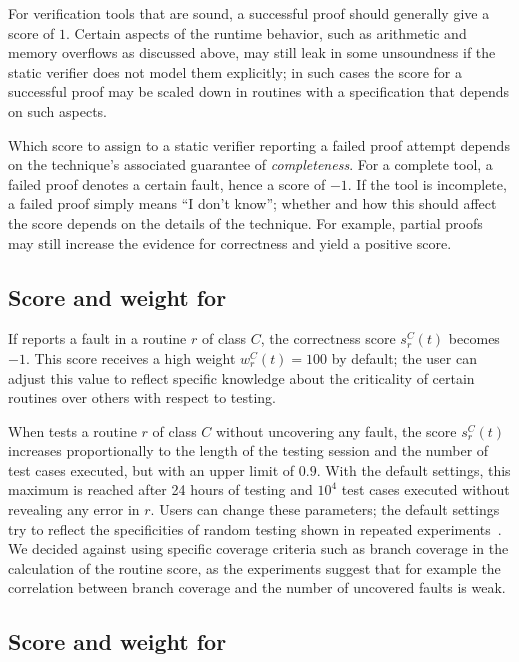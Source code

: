For verification tools that are sound, a successful proof should generally give a score of $1$.
Certain aspects of the runtime behavior, such as arithmetic and memory overflows as discussed above, may still leak in some unsoundness if the static verifier does not model them explicitly; in such cases the score for a successful proof may be scaled down in routines with a specification that depends on such aspects.

Which score to assign to a static verifier reporting a failed proof attempt depends on the technique's associated guarantee of \emph{completeness}.
For a complete tool, a failed proof denotes a certain fault, hence a score of $-1$.
If the tool is incomplete, a failed proof simply means ``I don't know''; whether and how this should affect the score depends on the details of the technique.
For example, partial proofs may still increase the evidence for correctness and yield a positive score.


\subsection{Score and weight for \AutoTest}

If \AutoTest reports a fault in a routine $r$ of class $C$, the correctness score $s_r^C(t)$ becomes $-1$.  This score receives a high weight $w_r^C(t) = 100$ by default; the user can adjust this value to reflect specific knowledge about the criticality of certain routines over others with respect to testing.

When \AutoTest tests a routine $r$ of class $C$ without uncovering any fault, the score $s_r^C(t)$ increases proportionally to the length of
the testing session and the number of test cases executed, but with an upper limit of $0.9$.
With the default settings, this maximum is reached after 24 hours of testing and $10^4$ test cases executed without revealing any error in $r$.
Users can change these parameters; the default settings try to reflect the specificities of random testing shown in repeated experiments~\cite{WEI12}. 
We decided against using specific coverage criteria such as branch coverage in the calculation of the routine score, as the experiments suggest that for example the correlation between branch coverage and the number of uncovered faults is weak.



\subsection{Score and weight for \AutoProof}

